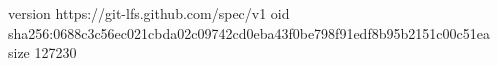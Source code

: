 version https://git-lfs.github.com/spec/v1
oid sha256:0688c3c56ec021cbda02c09742cd0eba43f0be798f91edf8b95b2151c00c51ea
size 127230

